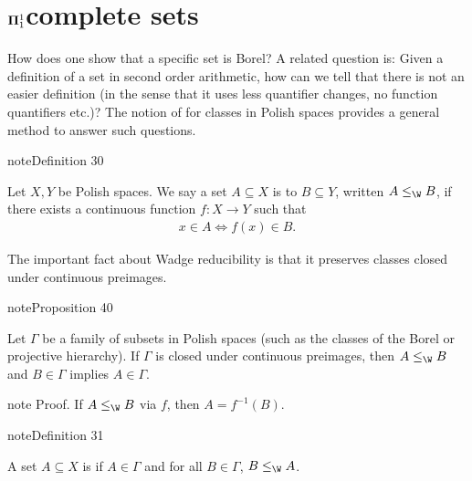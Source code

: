 \documentclass[letterpaper,10pt,english]{jupyterBook}
\begin{document}
\section{\protect\(\mathbf{\Pi}^1_1\protect\)\sphinxhyphen{}complete sets}
\label{\detokenize{coanalytic:mathbf-pi-1-1-complete-sets}}
\sphinxAtStartPar
How does one show that a specific set is  Borel? A related question is: Given a definition of a set in second order arithmetic, how can we tell that there is not an easier definition (in the sense that it uses less quantifier changes, no function quantifiers etc.)? The notion of  for classes in Polish spaces provides a general method to answer such questions.
\label{coanalytic:def-Wadge}
\begin{sphinxadmonition}{note}{Definition 30}



\sphinxAtStartPar
Let \(X,Y\) be Polish spaces. We say a set \(A \subseteq X\) is  to \(B \subseteq Y\), written \(A \leq_{\W} B\), if there exists a continuous function \(f: X \to Y\) such that
\begin{equation*}
\begin{split}
	x \in A \iff f(x) \in B.
\end{split}
\end{equation*}\end{sphinxadmonition}

\sphinxAtStartPar
The important fact about Wadge reducibility is that it preserves classes closed under continuous preimages.
\label{coanalytic:prop-Wadge-preimages}
\begin{sphinxadmonition}{note}{Proposition 40}



\sphinxAtStartPar
Let \(\Gamma\) be a family of subsets in Polish spaces (such as the classes of the Borel or projective hierarchy). If \(\Gamma\) is closed under continuous preimages, then \(A \leq_{\W} B\) and \(B \in \Gamma\) implies \(A \in \Gamma\).
\end{sphinxadmonition}

\begin{sphinxadmonition}{note}
\sphinxAtStartPar
Proof. If \(A \leq_{\W} B\) via \(f\), then \(A = f^{-1}(B)\).
\end{sphinxadmonition}
\label{coanalytic:def-completeness}
\begin{sphinxadmonition}{note}{Definition 31}



\sphinxAtStartPar
A set \(A \subseteq X\) is  if \(A \in \Gamma\) and for all \(B \in \Gamma\), \(B \leq_{\W} A\).
\end{sphinxadmonition}
\end{document}

